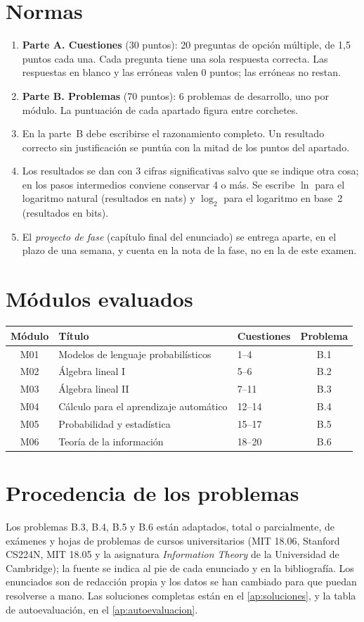 \section*{Normas}
\begin{enumerate}[label=\arabic*.]
  \item \textbf{Parte A. Cuestiones} (30 puntos): 20 preguntas de opción múltiple, de 1,5 puntos cada una. Cada pregunta tiene una sola respuesta correcta. Las respuestas en blanco y las erróneas valen 0 puntos; las erróneas no restan.
  \item \textbf{Parte B. Problemas} (70 puntos): 6 problemas de desarrollo, uno por módulo. La puntuación de cada apartado figura entre corchetes.
  \item En la parte~B debe escribirse el razonamiento completo. Un resultado correcto sin justificación se puntúa con la mitad de los puntos del apartado.
  \item Los resultados se dan con 3 cifras significativas salvo que se indique otra cosa; en los pasos intermedios conviene conservar 4 o más. Se escribe $\ln$ para el logaritmo natural (resultados en nats) y $\log_2$ para el logaritmo en base~2 (resultados en bits).
  \item El \emph{proyecto de fase} (capítulo final del enunciado) se entrega aparte, en el plazo de una semana, y cuenta en la nota de la fase, no en la de este examen.
\end{enumerate}

\section*{Módulos evaluados}
\begin{center}
\begin{tabular}{@{}cllc@{}}
\toprule
Módulo & Título & Cuestiones & Problema \\
\midrule
M01 & Modelos de lenguaje probabilísticos & 1--4 & B.1 \\
M02 & Álgebra lineal I & 5--6 & B.2 \\
M03 & Álgebra lineal II & 7--11 & B.3 \\
M04 & Cálculo para el aprendizaje automático & 12--14 & B.4 \\
M05 & Probabilidad y estadística & 15--17 & B.5 \\
M06 & Teoría de la información & 18--20 & B.6 \\
\bottomrule
\end{tabular}
\end{center}

\section*{Procedencia de los problemas}
Los problemas B.3, B.4, B.5 y B.6 están adaptados, total o parcialmente, de exámenes y hojas de problemas de cursos universitarios (MIT 18.06, Stanford CS224N, MIT 18.05 y la asignatura \emph{Information Theory} de la Universidad de Cambridge); la fuente se indica al pie de cada enunciado y en la bibliografía. Los enunciados son de redacción propia y los datos se han cambiado para que puedan resolverse a mano. Las soluciones completas están en el \cref{ap:soluciones}, y la tabla de autoevaluación, en el \cref{ap:autoevaluacion}.
